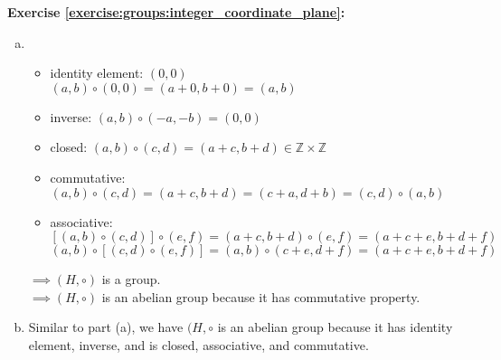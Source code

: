 \noindent\textbf{Exercise \ref{exercise:groups:integer_coordinate_plane}:}
\begin{enumerate}[(a)]
\item
	\begin{itemize}
	\item
	identity element: $(0, 0)$\\
	$(a, b) \circ (0, 0) = (a + 0, b + 0) = (a, b)$

	\item
	inverse: $(a, b) \circ (-a, -b) = (0, 0)$

	\item
	closed: $(a, b) \circ (c, d) = (a + c, b + d) \in {\mathbb Z} \times {\mathbb Z}$

	\item
	commutative: $(a, b) \circ (c, d) = (a + c, b + d) = (c + a, d + b) = (c, d) \circ (a, b)$

	\item
	associative:\\
	$[(a, b)\circ (c, d)]\circ (e, f) = (a + c, b + d)\circ (e, f) = (a + c + e, b + d + f)$\\
	$(a, b)\circ[(c, d)\circ (e, f)] = (a, b)\circ (c + e, d + f) = (a + c + e, b + d + f)$
	\end{itemize}

$\implies (H,\circ)$ is a group.\\
$\implies (H,\circ)$ is an abelian group because it has commutative property.

\item
Similar to part (a), we have $(H,\circ$ is an abelian group because it has identity element, inverse, and is closed, associative, and commutative.
\end{enumerate}

